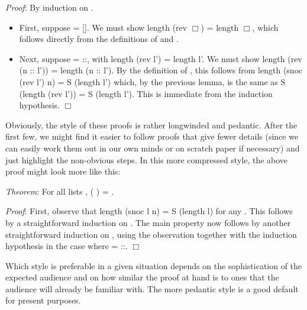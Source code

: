 \documentclass[12pt]{report}
\begin{document}
    \textit{Proof}: By induction on .  



\begin{itemize}
\item  First, suppose  = [].  We must show
          length (rev \ensuremath{\Box}) = length \ensuremath{\Box},
        which follows directly from the definitions of  
        and .



\item  Next, suppose  = ::, with
          length (rev l') = length l'.
        We must show
          length (rev (n :: l')) = length (n :: l').
        By the definition of , this follows from
          length (snoc (rev l') n) = S (length l')
        which, by the previous lemma, is the same as
          S (length (rev l')) = S (length l').
        This is immediate from the induction hypothesis. \ensuremath{\Box} 
\end{itemize}


 Obviously, the style of these proofs is rather longwinded
    and pedantic.  After the first few, we might find it easier to
    follow proofs that give fewer details (since we can easily work
    them out in our own minds or on scratch paper if necessary) and
    just highlight the non-obvious steps.  In this more compressed
    style, the above proof might look more like this: 

 \textit{Theorem}:
     For all lists ,  ( ) =  .


    \textit{Proof}: First, observe that
       length (snoc l n) = S (length l)
     for any .  This follows by a straightforward induction on .
     The main property now follows by another straightforward
     induction on , using the observation together with the
     induction hypothesis in the case where  = ::. \ensuremath{\Box} 

 Which style is preferable in a given situation depends on
    the sophistication of the expected audience and on how similar the
    proof at hand is to ones that the audience will already be
    familiar with.  The more pedantic style is a good default for
    present purposes. \begin{coqdoccode}
\coqdocemptyline
\end{coqdoccode}
\end{document}

